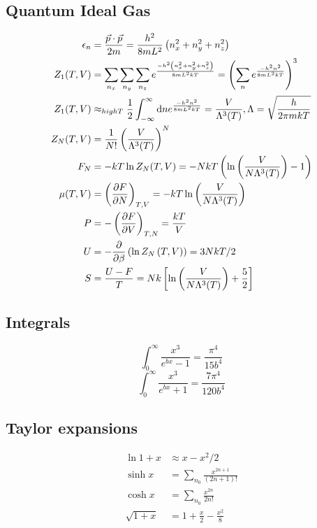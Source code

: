 \documentclass[a4paper, norsk, 8pt]{article}
\begin{document}
\begin{multicols*}{3}
\subsection*{\footnotesize Quantum Ideal Gas}
\begin{align*}
  \epsilon_n &= \frac{\vec{p}\cdot\vec{p}}{2m}  = \frac{h^2}{8mL^2}\left(n_x^2+n_y^2+n_z^2\right) \\
  Z_1(T,V) &= \sum_{n_x}\sum_{n_y}\sum_{n_z}e^{\frac{-h^2\left(n_x^2+n_y^2+n_z^2\right)}{8mL^2kT}} = \left( \sum_{n}e^{\frac{-h^2n^2}{8mL^2kT}} \right)^3 \\
  Z_1(T,V) &\approx_{high T} \frac{1}{2}\int_{-\infty}^{\infty}\mbox{d}n e^{\frac{-h^2n^2}{8mL^2kT}} = \frac{V}{\Lambda^3(T)}, \Lambda = \sqrt{\frac{h}{2\pi mkT}}\\
  Z_N(T,V) &= \frac{1}{N!}\left(\frac{V}{\Lambda^3(T)}\right)^N \\
  F_N &= -kT\ln{Z_N(T,V)} = -NkT\left( \ln{\left( \frac{V}{N\Lambda^3(T)}\right)} -1 \right)\\
  \mu(T,V) &= \left( \pdv{F}{N} \right)_{T,V} = -kT\ln{\left( \frac{V}{N\Lambda^3(T)} \right)} \\
  P &= -\left( \pdv{F}{V} \right)_{T,N} = \frac{kT}{V}\\
  U &= -\pdv{}{\beta}\left( \ln{Z_N\left(T, V\right)}\right) = 3NkT/2 \\
  S &= \frac{U-F}{T} = Nk\left[ \ln{\left( \frac{V}{N\Lambda^3(T)} \right)} + \frac{5}{2} \right]
\end{align*}

\subsection*{\footnotesize  Integrals}
$$ \int_0^{\infty} \frac{x^3}{e^{bx}-1} = \frac{\pi^4}{15b^4}$$
$$ \int_0^{\infty} \frac{x^3}{e^{bx}+1} = \frac{7\pi^4}{120b^4}$$

\subsection*{\footnotesize  Taylor expansions}
\begin{align*}
  \ln{1+x} &\approx x - x^2/2 \\
  \sinh{x} &= \sum_{n_0} \frac{x^{2n+1}}{(2n+1)!} \\
  \cosh{x} &= \sum_{n_0} \frac{x^{2n}}{2n!}\\
  \sqrt{1+x} &= 1 + \frac{x}{2} - \frac{x^2}{8}
\end{align*}


\end{multicols*}
\end{document}
